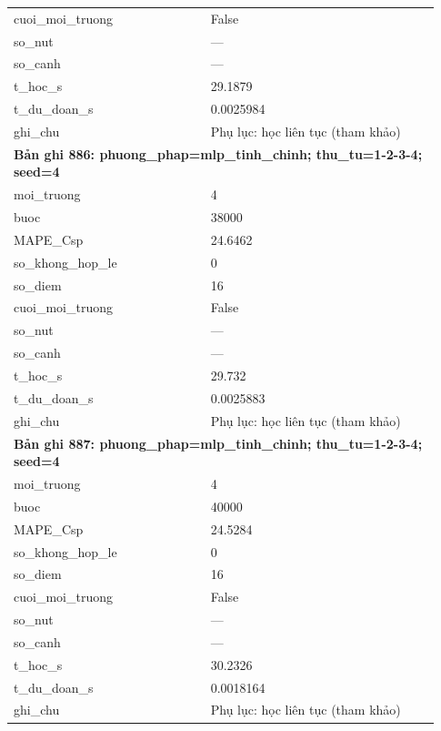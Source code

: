 \begin{longtable}{p{0.43\linewidth}p{0.50\linewidth}}
cuoi\_\allowbreak moi\_\allowbreak truong & False \\
so\_\allowbreak nut & — \\
so\_\allowbreak canh & — \\
t\_\allowbreak hoc\_\allowbreak s & 29.1879 \\
t\_\allowbreak du\_\allowbreak doan\_\allowbreak s & 0.0025984 \\
ghi\_\allowbreak chu & Phụ lục: học liên tục (tham khảo) \\
\midrule
\multicolumn{2}{p{0.95\linewidth}}{\textbf{Bản ghi 886: phuong\_phap=mlp\_tinh\_chinh; thu\_tu=1-2-3-4; seed=4}} \\
moi\_\allowbreak truong & 4 \\
buoc & 38000 \\
MAPE\_\allowbreak Csp & 24.6462 \\
so\_\allowbreak khong\_\allowbreak hop\_\allowbreak le & 0 \\
so\_\allowbreak diem & 16 \\
cuoi\_\allowbreak moi\_\allowbreak truong & False \\
so\_\allowbreak nut & — \\
so\_\allowbreak canh & — \\
t\_\allowbreak hoc\_\allowbreak s & 29.732 \\
t\_\allowbreak du\_\allowbreak doan\_\allowbreak s & 0.0025883 \\
ghi\_\allowbreak chu & Phụ lục: học liên tục (tham khảo) \\
\midrule
\multicolumn{2}{p{0.95\linewidth}}{\textbf{Bản ghi 887: phuong\_phap=mlp\_tinh\_chinh; thu\_tu=1-2-3-4; seed=4}} \\
moi\_\allowbreak truong & 4 \\
buoc & 40000 \\
MAPE\_\allowbreak Csp & 24.5284 \\
so\_\allowbreak khong\_\allowbreak hop\_\allowbreak le & 0 \\
so\_\allowbreak diem & 16 \\
cuoi\_\allowbreak moi\_\allowbreak truong & False \\
so\_\allowbreak nut & — \\
so\_\allowbreak canh & — \\
t\_\allowbreak hoc\_\allowbreak s & 30.2326 \\
t\_\allowbreak du\_\allowbreak doan\_\allowbreak s & 0.0018164 \\
ghi\_\allowbreak chu & Phụ lục: học liên tục (tham khảo) \\

\end{longtable}
